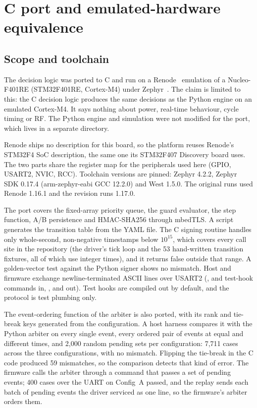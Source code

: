 \documentclass[preprint,12pt]{elsarticle}
\newcommand{\cfgA}{Config~A}
\begin{document}
\section{C port and emulated-hardware equivalence}\label{sec:cport}

\subsection{Scope and toolchain}

The decision logic was ported to C and run on a Renode~\cite{Renode} emulation of a Nucleo-F401RE (STM32F401RE, Cortex-M4) under Zephyr~\cite{Zephyr}. The claim is limited to this: the C decision logic produces the same decisions as the Python engine on an emulated Cortex-M4. It says nothing about power, real-time behaviour, cycle timing or RF. The Python engine and simulation were not modified for the port, which lives in a separate directory.

Renode ships no description for this board, so the platform reuses Renode's STM32F4 SoC description, the same one its STM32F407 Discovery board uses. The two parts share the register map for the peripherals used here (GPIO, USART2, NVIC, RCC). Toolchain versions are pinned: Zephyr 4.2.2, Zephyr SDK 0.17.4 (arm-zephyr-eabi GCC 12.2.0) and West 1.5.0. The original runs used Renode 1.16.1 and the revision runs 1.17.0.

The port covers the fixed-array priority queue, the guard evaluator, the step function, A/B persistence and HMAC-SHA256 through mbedTLS. A script generates the transition table from the YAML file. The C signing routine handles only whole-second, non-negative timestamps below $10^{15}$, which covers every call site in the repository (the driver's tick loop and the 53 hand-written transition fixtures, all of which use integer times), and it returns false outside that range. A golden-vector test against the Python signer shows no mismatch. Host and firmware exchange newline-terminated ASCII lines over USART2 (,  and test-hook commands in, ,  and  out). Test hooks are compiled out by default, and the protocol is test plumbing only.

The event-ordering function of the arbiter is also ported, with its rank and tie-break keys generated from the configuration. A host harness compares it with the Python arbiter on every single event, every ordered pair of events at equal and different times, and 2,000 random pending sets per configuration: 7,711 cases across the three configurations, with no mismatch. Flipping the  tie-break in the C code produced 59 mismatches, so the comparison detects that kind of error. The firmware calls the arbiter through a  command that passes a set of pending events; 400 cases over the UART on \cfgA{} passed, and the replay sends each batch of pending events the driver serviced as one  line, so the firmware's arbiter orders them.
\end{document}
